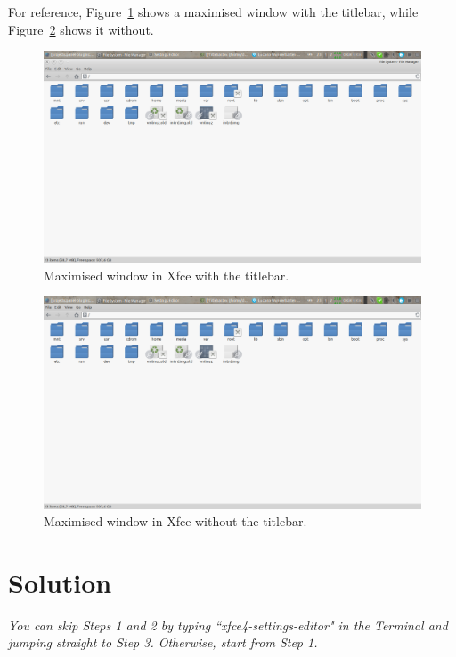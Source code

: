 \documentclass[12pt, a4paper]{article}
\begin{document}
For reference, Figure~\ref{fig1} shows a maximised window with the titlebar, while Figure~\ref{fig2} shows it without.

\begin{figure}[!h]
  \centering
  \includegraphics[width=1\textwidth]{imgs/1xfcewithtitlebar.png}
  \caption{Maximised window in Xfce with the titlebar.}
  \label{fig1}
\end{figure}

\begin{figure}[!h]
  \centering
  \includegraphics[width=1\textwidth]{imgs/2xfcewithouttitlebar.png}
  \caption{Maximised window in Xfce without the titlebar.}
  \label{fig2}
\end{figure}

\section*{Solution}

\emph{You can skip Steps 1 and 2 by typing ``xfce4-settings-editor" in the Terminal and jumping straight to Step 3. Otherwise, start from Step 1.}\\
\end{document}
